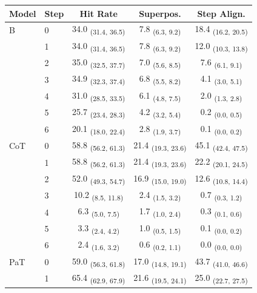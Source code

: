 \begin{table}[h!]
\centering
\small
\begin{tabular}{ll ccc}
\toprule
\textbf{Model} & \textbf{Step} & \textbf{Hit Rate} & \textbf{Superpos.} & \textbf{Step Align.} \\
\midrule
B & 0 & 34.0 \textsubscript{(31.4, 36.5)} & 7.8 \textsubscript{(6.3, 9.2)} & 18.4 \textsubscript{(16.2, 20.5)} \\
 & 1 & 34.0 \textsubscript{(31.4, 36.5)} & 7.8 \textsubscript{(6.3, 9.2)} & 12.0 \textsubscript{(10.3, 13.8)} \\
 & 2 & 35.0 \textsubscript{(32.5, 37.7)} & 7.0 \textsubscript{(5.6, 8.5)} & 7.6 \textsubscript{(6.1, 9.1)} \\
 & 3 & 34.9 \textsubscript{(32.3, 37.4)} & 6.8 \textsubscript{(5.5, 8.2)} & 4.1 \textsubscript{(3.0, 5.1)} \\
 & 4 & 31.0 \textsubscript{(28.5, 33.5)} & 6.1 \textsubscript{(4.8, 7.5)} & 2.0 \textsubscript{(1.3, 2.8)} \\
 & 5 & 25.7 \textsubscript{(23.4, 28.3)} & 4.2 \textsubscript{(3.2, 5.4)} & 0.2 \textsubscript{(0.0, 0.5)} \\
 & 6 & 20.1 \textsubscript{(18.0, 22.4)} & 2.8 \textsubscript{(1.9, 3.7)} & 0.1 \textsubscript{(0.0, 0.2)} \\
\midrule
CoT & 0 & 58.8 \textsubscript{(56.2, 61.3)} & 21.4 \textsubscript{(19.3, 23.6)} & 45.1 \textsubscript{(42.4, 47.5)} \\
 & 1 & 58.8 \textsubscript{(56.2, 61.3)} & 21.4 \textsubscript{(19.3, 23.6)} & 22.2 \textsubscript{(20.1, 24.5)} \\
 & 2 & 52.0 \textsubscript{(49.3, 54.7)} & 16.9 \textsubscript{(15.0, 19.0)} & 12.6 \textsubscript{(10.8, 14.4)} \\
 & 3 & 10.2 \textsubscript{(8.5, 11.8)} & 2.4 \textsubscript{(1.5, 3.2)} & 0.7 \textsubscript{(0.3, 1.2)} \\
 & 4 & 6.3 \textsubscript{(5.0, 7.5)} & 1.7 \textsubscript{(1.0, 2.4)} & 0.3 \textsubscript{(0.1, 0.6)} \\
 & 5 & 3.3 \textsubscript{(2.4, 4.2)} & 1.0 \textsubscript{(0.5, 1.5)} & 0.1 \textsubscript{(0.0, 0.2)} \\
 & 6 & 2.4 \textsubscript{(1.6, 3.2)} & 0.6 \textsubscript{(0.2, 1.1)} & 0.0 \textsubscript{(0.0, 0.0)} \\
\midrule
PaT & 0 & 59.0 \textsubscript{(56.3, 61.8)} & 17.0 \textsubscript{(14.8, 19.1)} & 43.7 \textsubscript{(41.0, 46.6)} \\
 & 1 & 65.4 \textsubscript{(62.9, 67.9)} & 21.6 \textsubscript{(19.5, 24.1)} & 25.0 \textsubscript{(22.7, 27.5)} \\

\end{tabular}
\end{table}
